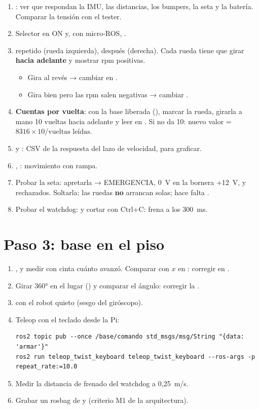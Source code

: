 \begin{enumerate}
  \item {}: ver que respondan la IMU, las distancias, los bumpers, la seta y la batería. Comparar la tensión
        con el tester.
  \item Selector en ON y, con micro-ROS, .
  \item {} repetido (rueda izquierda), después  (derecha). Cada rueda tiene que girar
        \textbf{hacia adelante} y  mostrar rpm positivas.
        \begin{itemize}
          \item Gira al revés → cambiar  en .
          \item Gira bien pero las rpm salen negativas → cambiar .
        \end{itemize}
  \item \textbf{Cuentas por vuelta}: con la base liberada (), marcar la rueda, girarla a mano 10 vueltas hacia
        adelante y leer  en . Si no da 10: nuevo valor = $8316 \times 10 / \text{vueltas leídas}$.
  \item {} y : CSV de la respuesta del lazo de velocidad, para graficar.
  \item {}, : movimiento con rampa.
  \item Probar la seta: apretarla → EMERGENCIA, 0~V en la bornera +12~V,  y  rechazados. Soltarla:
        las ruedas \textbf{no} arrancan solas; hace falta .
  \item Probar el watchdog:  y cortar con Ctrl+C: frena a los 300~ms.
\end{enumerate}

\section{Paso 3: base en el piso}

\begin{enumerate}
  \item {},  y medir con cinta cuánto avanzó. Comparar con $x$ en : corregir
         en .
  \item Girar 360° en el lugar () y comparar el ángulo: corregir la .
  \item {} con el robot quieto (sesgo del giróscopo).
  \item Teleop con el teclado desde la Pi:
\begin{lstlisting}[language=consola]
ros2 topic pub --once /base/comando std_msgs/msg/String "{data: 'armar'}"
ros2 run teleop_twist_keyboard teleop_twist_keyboard --ros-args -p repeat_rate:=10.0
\end{lstlisting}
  \item Medir la distancia de frenado del watchdog a 0,25~m/s.
  \item Grabar un rosbag de  y  (criterio M1 de la arquitectura).
\end{enumerate}

